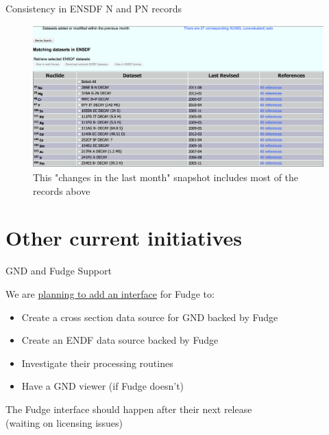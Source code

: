 \documentclass[xcolor=x11names,compress]{beamer}
\renewcommand{\(}{\begin{columns}}
\renewcommand{\)}{\end{columns}}
\newcommand{\<}[1]{\begin{column}{#1}}
\renewcommand{\>}{\end{column}}
\begin{document}
\begin{frame}{Consistency in ENSDF N and PN records}
   
    \begin{figure}
      \includegraphics[height=5.5cm]{../2014-PyNEforData/ensdf_updates}
      \caption{This "changes in the last month" snapshot includes most of 
      the records above}
    \end{figure}

\end{frame}

\section{Other current initiatives}
\begin{frame}{GND and Fudge Support}

    We are \href{https://github.com/pyne/pyne/issues/236}{planning to add an interface}
    for \alert{Fudge} to: 

    \vspace*{1 em}

    \begin{itemize}
      \item Create a cross section data source for GND backed by Fudge
      \item Create an ENDF data source backed by Fudge
      \item Investigate their processing routines
      \item Have a GND viewer (if Fudge doesn't)
    \end{itemize}
    
    \vspace*{1 em}
    The Fudge interface should happen after their next release\\
    \hspace*{1.5 em}(waiting on licensing issues)

\end{frame}
\end{document}
